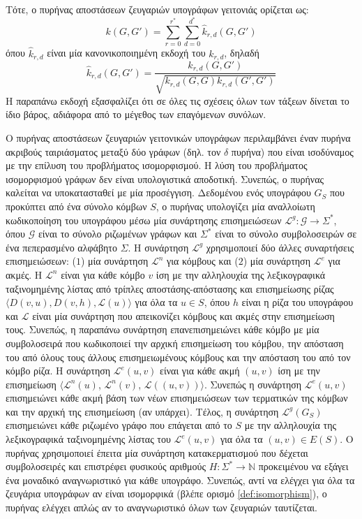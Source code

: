 Τότε, ο πυρήνας αποστάσεων ζευγαριών υπογράφων γειτονιάς ορίζεται ως:
\begin{equation}
    k(G, G') = \sum_{r=0}^{r^*} \sum_{d=0}^{d^*} \hat{k}_{r,d}(G, G')
\end{equation}
όπου $\hat{k}_{r,d}$ είναι μία κανονικοποιημένη εκδοχή του $k_{r,d}$, δηλαδή
\begin{equation*}
    \hat{k}_{r,d}(G,G') = \frac{k_{r,d}(G,G')}{\sqrt{k_{r,d}(G,G) k_{r,d}(G',G')}}
\end{equation*}
Η παραπάνω εκδοχή εξασφαλίζει ότι σε όλες τις σχέσεις όλων των τάξεων δίνεται το ίδιο βάρος, αδιάφορα από το μέγεθος των επαγόμενων συνόλων.\par
Ο πυρήνας αποστάσεων ζευγαριών γειτονικών υπογράφων περιλαμβάνει έναν πυρήνα ακριβούς ταιριάσματος μεταξύ δύο γράφων (δηλ. τον $\delta$ πυρήνα) που είναι ισοδύναμος με την επίλυση του προβλήματος ισομορφισμού.
Η λύση του προβλήματος ισομορφισμού γράφων δεν είναι υπολογιστικά αποδοτική.
Συνεπώς, ο πυρήνας καλείται να υποκατασταθεί με μία προσέγγιση.
Δεδομένου ενός υπογράφου $G_S$ που προκύπτει από ένα σύνολο κόμβων $S$, ο πυρήνας υπολογίζει μία αναλλοίωτη κωδικοποίηση του υπογράφου μέσω μία συνάρτησης επισημειώσεων $\mathcal{L}^g : \mathcal{G} \rightarrow \Sigma^*$, όπου $\mathcal{G}$ είναι το σύνολο ριζωμένων γράφων και $\Sigma^*$ είναι το σύνολο συμβολοσειρών σε ένα πεπερασμένο αλφάβητο $\Sigma$.
Η συνάρτηση $\mathcal{L}^g$ χρησιμοποιεί δύο άλλες συναρτήσεις επισημειώσεων: ($1$) μία συνάρτηση $\mathcal{L}^n$ για κόμβους και ($2$) μία συνάρτηση $\mathcal{L}^e$ για ακμές.
Η $\mathcal{L}^n$ είναι για κάθε κόμβο $v$ ίση με την αλληλουχία της λεξικογραφικά ταξινομημένης λίστας από τρίπλες αποστάσης-απόστασης και επισημείωσης ρίζας $\langle D(v,u), D(v,h), \mathcal{L}(u) \rangle$ για όλα τα $u \in S$, όπου $h$ είναι η ρίζα του υπογράφου και $\mathcal{L}$ είναι μία συνάρτηση που απεικονίζει κόμβους και ακμές στην επισημείωση τους.
Συνεπώς, η παραπάνω συνάρτηση επανεπισημειώνει κάθε κόμβο με μία συμβολοσειρά που κωδικοποιεί την αρχική επισημείωση του κόμβου, την απόσταση του από όλους τους άλλους επισημειωμένους κόμβους και την απόσταση του από τον κόμβο ρίζα.
Η συνάρτηση $\mathcal{L}^e(u,v)$ είναι για κάθε ακμή $(u,v)$ ίση με την επισημείωση $\langle \mathcal{L}^n(u)$, $\mathcal{L}^n(v)$, $\mathcal{L}((u,v)) \rangle$.
Συνεπώς η συνάρτηση $\mathcal{L}^e(u,v)$ επισημειώνει κάθε ακμή βάση των νέων επισημειώσεων των τερματικών της κόμβων και την αρχική της επισημείωση (αν υπάρχει).
Τέλος, η συνάρτηση $\mathcal{L}^g(G_S)$ επισημειώνει κάθε ριζωμένο γράφο που επάγεται από το $S$ με την αλληλουχία της λεξικογραφικά ταξινομημένης λίστας του $\mathcal{L}^e(u,v)$ για όλα τα $(u,v) \in E(S)$.
Ο πυρήνας χρησιμοποιεί έπειτα μία συνάρτηση κατακερματισμού που δέχεται συμβολοσειρές και επιστρέφει φυσικούς αριθμούς $H : \Sigma^* \rightarrow \mathbb{N}$ προκειμένου να εξάγει ένα μοναδικό αναγνωριστικό για κάθε υπογράφο.
Συνεπώς, αντί να ελέγχει για όλα τα ζευγάρια υπογράφων αν είναι ισομορφικά (βλέπε ορισμό \ref{def:isomorphism}), ο πυρήνας ελέγχει απλώς αν το αναγνωριστικό όλων των ζευγαριών ταυτίζεται.

